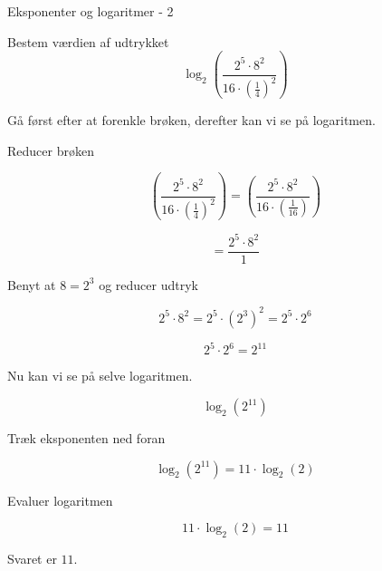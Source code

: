 \documentclass{article}
\begin{document}
\begin{exercise}{Eksponenter og logaritmer - 2}
	
	Bestem værdien af udtrykket
	\[
	\log_2\left( \frac{2^5 \cdot 8^2}{16 \cdot \left(\frac{1}{4}\right)^2} \right)
	\]
	
	
	\hint
	Gå først efter at forenkle brøken, derefter kan vi se på logaritmen.
	
	\hint
	Reducer brøken 
	
	\hint
	\[
	\left( \frac{2^5 \cdot 8^2}{16 \cdot \left(\frac{1}{4}\right)^2} \right) = \left( \frac{2^5 \cdot 8^2}{16 \cdot \left(\frac{1}{16}\right)} \right)
	\]
	
	\hint
	\[
	= \frac{2^5 \cdot 8^2}{1}
	\]
	
	\hint
	Benyt at $8=2^3$ og reducer udtryk
	
	\hint
	\[
	2^5 \cdot 8^2 = 2^5 \cdot (2^3)^2 = 2^5 \cdot 2^6
 	\]
	
	\hint
	\[
	2^5 \cdot 2^6 = 2^{11}
	\]
	
	
	\hint
	Nu kan vi se på selve logaritmen.
	
	\hint
	\[
	\log_2\left(2^{11}\right)
	\]

	
	\hint
	Træk eksponenten ned foran
	
	\hint
	\[
	\log_2\left(2^{11}\right) = 11 \cdot \log_2(2)
	\]
	
	\hint
	Evaluer logaritmen
	
	\hint
	\[
	11 \cdot \log_2(2) = 11
	\]
	
	\hint
	Svaret er $11$.
	
\end{exercise}

\newpage
\end{document}
